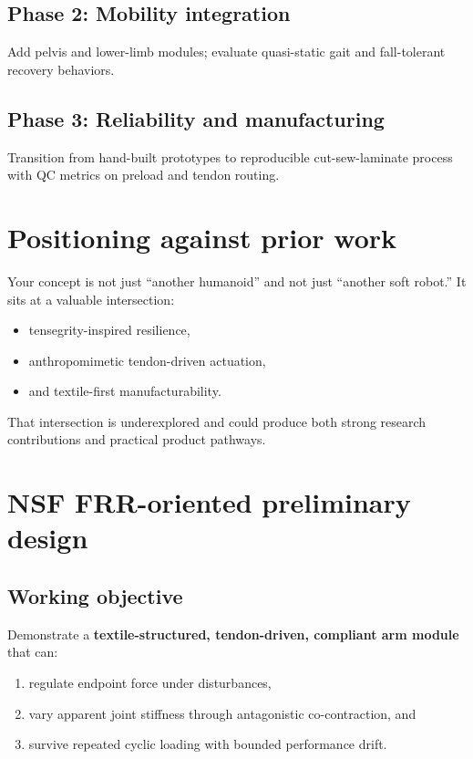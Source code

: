 \documentclass[11pt]{article}
\begin{document}
\subsection*{Phase 2: Mobility integration}
Add pelvis and lower-limb modules; evaluate quasi-static gait and fall-tolerant recovery behaviors.

\subsection*{Phase 3: Reliability and manufacturing}
Transition from hand-built prototypes to reproducible cut-sew-laminate process with QC metrics on preload and tendon routing.

\section*{Positioning against prior work}
Your concept is not just ``another humanoid'' and not just ``another soft robot.''
It sits at a valuable intersection:
\begin{itemize}[leftmargin=*]
  \item tensegrity-inspired resilience,
  \item anthropomimetic tendon-driven actuation,
  \item and textile-first manufacturability.
\end{itemize}

That intersection is underexplored and could produce both strong research contributions and practical product pathways.

\section*{NSF FRR-oriented preliminary design}
\subsection*{Working objective}
Demonstrate a \textbf{textile-structured, tendon-driven, compliant arm module} that can:
\begin{enumerate}[leftmargin=*]
  \item regulate endpoint force under disturbances,
  \item vary apparent joint stiffness through antagonistic co-contraction, and
  \item survive repeated cyclic loading with bounded performance drift.
\end{enumerate}
\end{document}
